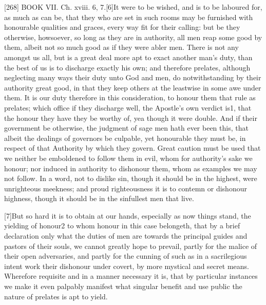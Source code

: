 [268]
BOOK VII. Ch. xviii. 6, 7.[6]It were to be wished, and is to be laboured for, as much as can be, that they who are set in such rooms may be furnished with honourable qualities and graces, every way fit for their calling: but be they otherwise, howsoever, so long as they are in authority, all men reap some good by them, albeit not so much good as if they were abler men. There is not any amongst us all, but is a great deal more apt to exact another man’s duty, than the best of us is to discharge exactly his own; and therefore prelates, although neglecting many ways their duty unto God and men, do notwithstanding by their authority great good, in that they keep others at the leastwise in some awe under them. It is our duty therefore in this consideration, to honour them that rule as prelates; which office if they discharge well, the Apostle’s own verdict is1, that the honour they have they be worthy of, yea though it were double. And if their government be otherwise, the judgment of sage men hath ever been this, that albeit the dealings of governors be culpable, yet honourable they must be, in respect of that Authority by which they govern. Great caution must be used that we neither be emboldened to follow them in evil, whom for authority’s sake we honour; nor induced in authority to dishonour them, whom as examples we may not follow. In a word, not to dislike sin, though it should be in the highest, were unrighteous meekness; and proud righteousness it is to contemn or dishonour highness, though it should be in the sinfullest men that live.

[7]But so hard it is to obtain at our hands, especially as now things stand, the yielding of honour2 to whom honour in this case belongeth, that by a brief declaration only what the duties of men are towards the principal guides and pastors of their souls, we cannot greatly hope to prevail, partly for the malice of their open adversaries, and partly for the cunning of such as in a sacrilegious intent work their dishonour under covert, by more mystical and secret means. Wherefore requisite and in a manner necessary it is, that by particular instances we make it even palpably manifest what singular benefit and use public the nature of prelates is apt to yield.

